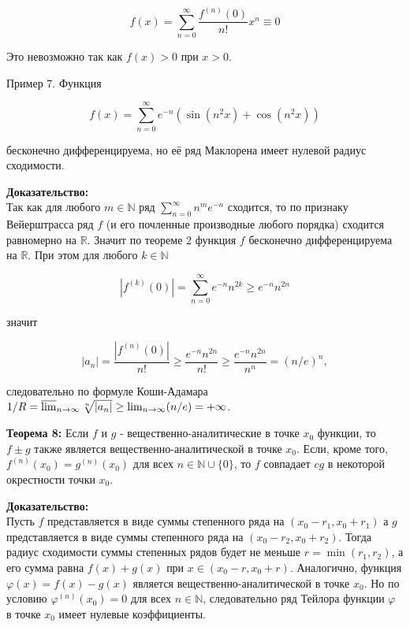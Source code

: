 \documentclass[a4paper,12pt]{article} %
\begin{document}
$$
f(x)=\sum_{n=0}^{\infty} \frac{f^{(n)}(0)}{n !} x^{n} \equiv 0
$$

Это невозможно так как $f(x)>0$ при $x>0$.

Пример 7. Функция

$$
f(x)=\sum_{n=0}^{\infty} e^{-n}\left(\sin \left(n^{2} x\right)+\cos \left(n^{2} x\right)\right)
$$

бесконечно дифференцируема, но её ряд Маклорена имеет нулевой радиус сходимости.

\textbf{Доказательство:}\\
Так как для любого $m \in \mathbb{N}$ ряд $\sum_{n=0}^{\infty} n^{m} e^{-n}$ сходится, то по признаку Вейерштрасса ряд $f$ (и его почленные производные любого порядка) сходится равномерно на $\mathbb{R}$. Значит по теореме 2 функция $f$ бесконечно дифференцируема на $\mathbb{R}$. При этом для любого $k \in \mathbb{N}$

$$
\left|f^{(k)}(0)\right|=\sum_{n=0}^{\infty} e^{-n} n^{2 k} \geq e^{-n} n^{2 n}
$$

значит

$$
\left|a_{n}\right|=\frac{\left|f^{(n)}(0)\right|}{n !} \geq \frac{e^{-n} n^{2 n}}{n !} \geq \frac{e^{-n} n^{2 n}}{n^{n}}=(n / e)^{n},
$$

следовательно по формуле Коши-Адамара $1 / R=\varlimsup_{n \rightarrow \infty} \sqrt[n]{\left|a_{n}\right|} \geq \lim _{n \rightarrow \infty}(n / e)=+\infty$.

\textbf{Теорема 8:} Если $f$ и $g$ - вещественно-аналитические в точке $x_{0}$ функции, то $f \pm g$ также является вещественно-аналитической в точке $x_{0}$. Если, кроме того, $f^{(n)}\left(x_{0}\right)=g^{(n)}\left(x_{0}\right)$ для всех $n \in \mathbb{N} \cup\{0\}$, то $f$ совпадает $c g$ в некоторой окрестности точки $x_{0}$.

\textbf{Доказательство:}\\
Пусть $f$ представляется в виде суммы степенного ряда на $\left(x_{0}-r_{1}, x_{0}+r_{1}\right)$ а $g$ представляется в виде суммы степенного ряда на $\left(x_{0}-r_{2}, x_{0}+r_{2}\right)$. Тогда радиус сходимости суммы степенных рядов будет не меньше $r=\min \left(r_{1}, r_{2}\right)$, а его сумма равна $f(x)+g(x)$ при $x \in\left(x_{0}-r, x_{0}+r\right)$.
Аналогично, функция $\varphi(x)=f(x)-g(x)$ является вещественно-аналитической в точке $x_0$. Но по условию $\varphi^{(n)}\left(x_0\right)=0$ для всех $n \in \mathbb{N}$, следовательно ряд Тейлора функции $\varphi$ в точке $x_0$ имеет нулевые коэффициенты.
\end{document}
